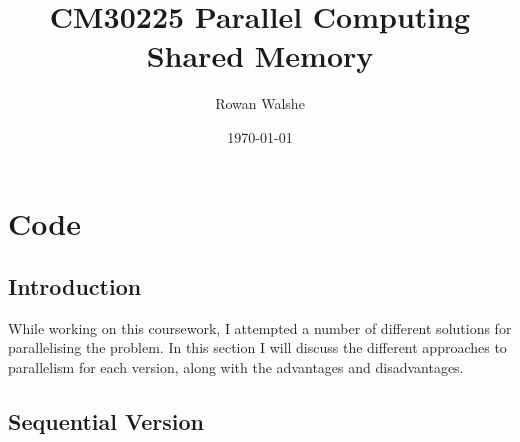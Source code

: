 \documentclass{report}
\title{CM30225 Parallel Computing\\Shared Memory} %
\author{Rowan Walshe} %
\date{\today} %
\begin{document}
\maketitle %
\pagebreak

\chapter{Code}
\section{Introduction}
While working on this coursework, I attempted a number of different solutions for parallelising the problem. In this section I will discuss the different approaches to parallelism for each version, along with the advantages and disadvantages.
\section{Sequential Version}
\end{document}

